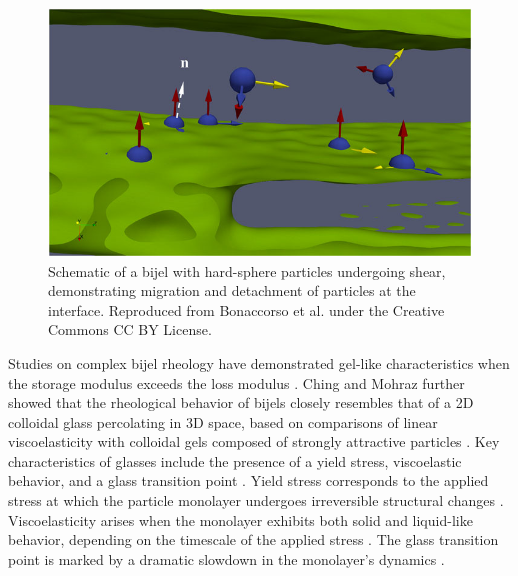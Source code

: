 \begin{figure}
    \centering
    \includegraphics[scale = 2]{figures/literature_review/bijel_under_shear.jpeg}
    \caption{Schematic of a bijel with hard-sphere particles undergoing shear, demonstrating migration and detachment of particles at the interface. 
             Reproduced from Bonaccorso et al. under the Creative Commons CC BY License. \cite{bonaccorso_shear_2020}}
    \label{fig:bijel_under_shear}
\end{figure} 

Studies on complex bijel rheology have demonstrated gel-like characteristics when the storage modulus exceeds the loss modulus \cite{lee_making_2013, bai_dynamics_2015}. 
Ching and Mohraz further showed that the rheological behavior of bijels closely resembles that of a 2D colloidal glass percolating in 3D space, based on comparisons of 
linear viscoelasticity with colloidal gels composed of strongly attractive particles \cite{ching_bijel_2022}. Key characteristics of glasses include the presence of a 
yield stress, viscoelastic behavior, and a glass transition point \cite{pham_yielding_2008, weeks_introduction_2017}. Yield stress corresponds to the applied stress at 
which the particle monolayer undergoes irreversible structural changes \cite{pham_yielding_2008}. Viscoelasticity arises when the monolayer exhibits both solid and 
liquid-like behavior, depending on the timescale of the applied stress \cite{pham_yielding_2008}. The glass transition point is marked by a dramatic slowdown in the 
monolayer's dynamics \cite{weeks_introduction_2017}. 



